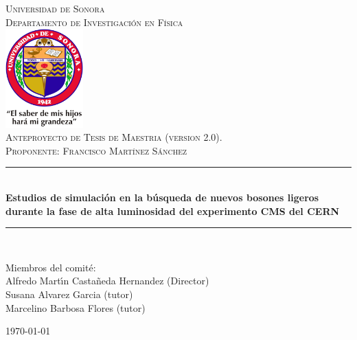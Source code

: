 \newcommand{\HRule}{\rule{\linewidth}{0.5mm}} 

\begin{titlepage}
\center
\textsc{
\Huge{Universidad de Sonora}\\[.5cm]
\Large
Departamento de Investigaci\'on en F\'{\i}sica\\[1cm] 
\includegraphics[width=3cm]{unison}\\[3cm]
Anteproyecto de Tesis de Maestria (version 2.0). \\[.7cm] 
Proponente: Francisco Mart\'{\i}nez S\'anchez}\\[.7cm] 

\sffamily
\HRule \\[0.4cm]
\textbf{\LARGE Estudios de simulación en la búsqueda de nuevos
bosones ligeros durante la fase de alta luminosidad del
experimento CMS del CERN}\\[0.2cm] 
\HRule \\[3cm]
 
\large
\begin{minipage}[t]{.6\textwidth}
\begin{flushleft}
Miembros del comit\'e:
\\
Alfredo Mart\'{\i}n Casta\~neda Hernandez (Director)\\
Susana Alvarez Garcia (tutor)\\
Marcelino Barbosa Flores (tutor)\\
\end{flushleft}

\end{minipage}\hfill




{\today}\\[3cm]

\end{titlepage}



